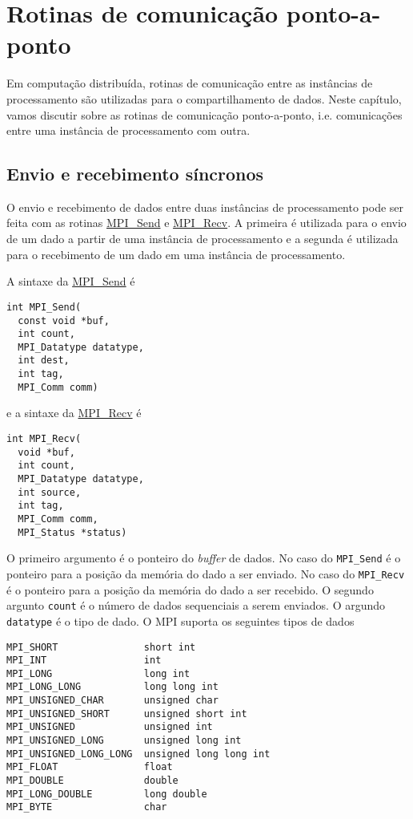 \section{Rotinas de comunicação ponto-a-ponto}\label{cap_mpi_sec_p2pcom}

Em computação distribuída, rotinas de comunicação entre as instâncias de processamento são utilizadas para o compartilhamento de dados. Neste capítulo, vamos discutir sobre as rotinas de comunicação ponto-a-ponto, i.e. comunicações entre uma instância de processamento com outra.

\subsection {Envio e recebimento síncronos}

O envio e recebimento de dados entre duas instâncias de processamento pode ser feita com as rotinas \href{https://www.open-mpi.org/doc/current/man3/MPI\_Send.3.php}{MPI\_Send} e \href{https://www.open-mpi.org/doc/current/man3/MPI\_Recv.3.php}{MPI\_Recv}. A primeira é utilizada para o envio de um dado a partir de uma instância de processamento e a segunda é utilizada para o recebimento de um dado em uma instância de processamento.

A sintaxe da \href{https://www.open-mpi.org/doc/current/man3/MPI\_Send.3.php}{MPI\_Send} é
\begin{verbatim}
int MPI_Send(
  const void *buf, 
  int count, 
  MPI_Datatype datatype, 
  int dest,
  int tag, 
  MPI_Comm comm)
\end{verbatim}
e a sintaxe da \href{https://www.open-mpi.org/doc/current/man3/MPI\_Send.3.php}{MPI\_Recv} é
\begin{verbatim}
int MPI_Recv(
  void *buf, 
  int count, 
  MPI_Datatype datatype,
  int source, 
  int tag, 
  MPI_Comm comm, 
  MPI_Status *status)
\end{verbatim}

O primeiro argumento é o ponteiro do {\it buffer} de dados. No caso do \verb+MPI_Send+ é o ponteiro para a posição da memória do dado a ser enviado. No caso do \verb+MPI_Recv+ é o ponteiro para a posição da memória do dado a ser recebido. O segundo argunto \verb+count+ é o número de dados sequenciais a serem enviados. O argundo \verb+datatype+ é o tipo de dado. O MPI suporta os seguintes tipos de dados
\begin{verbatim}
MPI_SHORT               short int
MPI_INT                 int
MPI_LONG                long int
MPI_LONG_LONG           long long int
MPI_UNSIGNED_CHAR       unsigned char
MPI_UNSIGNED_SHORT      unsigned short int
MPI_UNSIGNED            unsigned int
MPI_UNSIGNED_LONG       unsigned long int
MPI_UNSIGNED_LONG_LONG  unsigned long long int
MPI_FLOAT               float
MPI_DOUBLE              double
MPI_LONG_DOUBLE         long double
MPI_BYTE                char
\end{verbatim}

